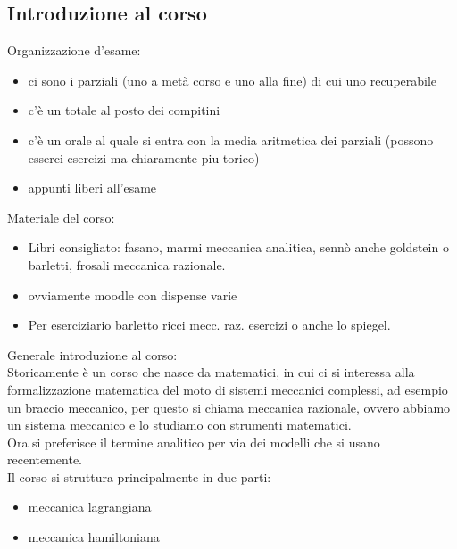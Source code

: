 \documentclass[a4paper, oneside]{article}
\begin{document}
\subsection{Introduzione al corso}
Organizzazione d'esame:
\begin{itemize}
    \item ci sono i parziali (uno a metà corso e uno alla fine) di cui uno recuperabile
    \item c'è un totale al posto dei compitini
    \item c'è un orale al quale si entra con la media aritmetica dei parziali (possono esserci esercizi ma chiaramente piu torico)
    \item appunti liberi all'esame
\end{itemize}
Materiale del corso:
\begin{itemize}
    \item Libri consigliato: fasano, marmi meccanica analitica, sennò anche goldstein o barletti, frosali meccanica razionale.
    \item ovviamente moodle con dispense varie
    \item Per eserciziario barletto ricci mecc. raz. esercizi o anche lo spiegel.
\end{itemize}
Generale introduzione al corso:\\
Storicamente è un corso che nasce da matematici, in cui ci si interessa alla formalizzazione matematica del moto di sistemi meccanici complessi,
ad esempio un braccio meccanico, per questo si chiama meccanica razionale, ovvero abbiamo un sistema meccanico e lo studiamo con strumenti matematici.\\
Ora si preferisce il termine analitico per via dei modelli che si usano recentemente.\\
Il corso si struttura principalmente in due parti:
\begin{itemize}
    \item meccanica lagrangiana
    \item meccanica hamiltoniana
\end{itemize}
\end{document}

